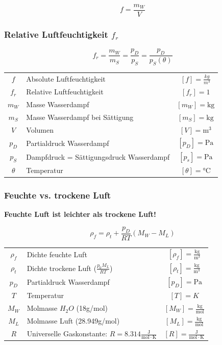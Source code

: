 $$ \boxed{ f = \frac{m_W}{V}  } $$



\subsubsection{Relative Luftfeuchtigkeit $f_r$}

$$ \boxed{ f_r = \frac{m_W}{m_S} = \frac{p_D}{p_S} = \frac{p_D}{p_S(\theta)}  } $$



\begin{tabular}{c l c}
	$f$ & Absolute Luftfeuchtigkeit & $[f] = \frac{kg}{m^3}$ \\
	$f_r$ & Relative Luftfeuchtigkeit & $[f_r] = 1$ \\
	$m_W$ & Masse Wasserdampf & $[m_W] = \mathrm{kg}$ \\
	$m_S$ & Masse Wasserdampf bei Sättigung & $[m_S] = \mathrm{kg}$ \\
	$V$ & Volumen & $[V] = \mathrm{m^3}$ \\
	$p_D$ & Partialdruck Wasserdampf & $[p_D] = \mathrm{Pa}$ \\
	$p_S$ & Dampfdruck = Sättigungsdruck Wasserdampf & $[p_s] = \mathrm{Pa}$ \\
	$\theta$ & Temperatur & $[\theta] = \text{°C}$ \\
\end{tabular}





\subsubsection{Feuchte vs. trockene Luft}

\textbf{Feuchte Luft ist leichter als trockene Luft!}


$$ \boxed{ \rho_f = \rho_t + \frac{p_D}{RT}(M_W - M_L)} $$

\begin{tabular}{c l c}
	\rule{0pt}{10pt}$\rho_f$ & Dichte feuchte Luft & $[\rho_f] = \mathrm{\frac{kg}{m^3}}$ \\
	\rule{0pt}{10pt}$\rho_t$ & Dichte trockene Luft ($ \frac{p_0 M_L}{RT} $) & $[\rho_t] = \mathrm{\frac{kg}{m^3}}$ \\
	\rule{0pt}{10pt}$p_D$ & Partialdruck Wasserdampf & $[p_D] = \mathrm{Pa}$ \\
	\rule{0pt}{10pt}$T$   & Temperatur & $[T] = K$ \\
	\rule{0pt}{10pt}$M_W$ & Molmasse $H_2O$ (18g/mol) & $[M_W] = \mathrm{\frac{kg}{mol}}$ \\
	\rule{0pt}{10pt}$M_L$ & Molmasse Luft (28.949g/mol) & $[M_L] = \mathrm{\frac{kg}{mol}}$ \\
	\rule{0pt}{10pt}$R$ & Universelle Gaskonstante: $R = 8.314 \mathrm{\frac{J}{mol \cdot K}}$ & $[R] = \mathrm{\frac{J}{mol \cdot K}} $ \\	
\end{tabular}



